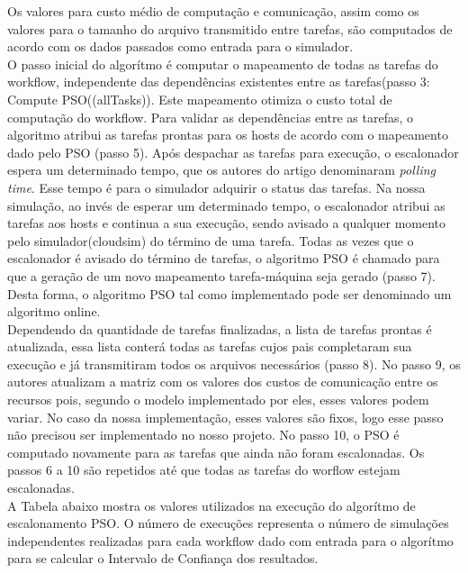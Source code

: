 \documentclass[a4paper,10pt]{article}
\begin{document}
Os valores para custo médio de computação e comunicação, assim como os valores para o tamanho 
do arquivo transmitido entre tarefas, são computados de acordo com os dados passados como entrada para o simulador.\\

O passo inicial do algorítmo é computar o mapeamento de todas as tarefas do workflow, independente das dependências
existentes entre as tarefas(passo 3: Compute PSO((allTasks)). Este mapeamento otimiza o custo total de computação do workflow. 
Para validar as dependências entre as tarefas, o algoritmo atribui as tarefas prontas para os hosts de acordo com o 
mapeamento dado pelo PSO (passo 5). Após despachar as tarefas para execução, o escalonador espera um determinado tempo, que
os autores do artigo denominaram \emph{polling time}. Esse tempo é para o simulador adquirir o status das tarefas.
Na nossa simulação, ao invés de esperar um determinado tempo, o escalonador atribui as tarefas aos hosts e continua a sua execução, sendo
avisado a qualquer momento pelo simulador(cloudsim) do término de uma tarefa. Todas as vezes que o escalonador é avisado do término de tarefas, 
o algoritmo PSO é chamado para que a geração de um novo mapeamento tarefa-máquina seja gerado (passo 7). Desta forma, o algoritmo PSO tal como
implementado pode ser denominado um algoritmo online.\\

Dependendo da quantidade de tarefas finalizadas, a lista de tarefas prontas é atualizada, essa lista conterá todas as tarefas 
cujos pais completaram sua execução e já transmitiram todos os arquivos necessários (passo 8). No passo 9, os autores 
atualizam a matriz com os valores dos custos de comunicação entre os recursos pois, segundo o modelo implementado por eles, 
esses valores podem variar. No caso da nossa implementação, esses valores são fixos, logo esse passo não precisou ser implementado 
no nosso projeto. No passo 10, o PSO é computado novamente para as tarefas que ainda não foram escalonadas. Os passos 6 a 10 
são repetidos até que todas as tarefas do worflow estejam escalonadas.\\

A Tabela abaixo mostra os valores utilizados na execução do algorítmo de escalonamento PSO. O número de execuções representa o número de 
simulações independentes realizadas para cada workflow dado com entrada para o algorítmo para se calcular o Intervalo de Confiança dos resultados.\\
\end{document}
